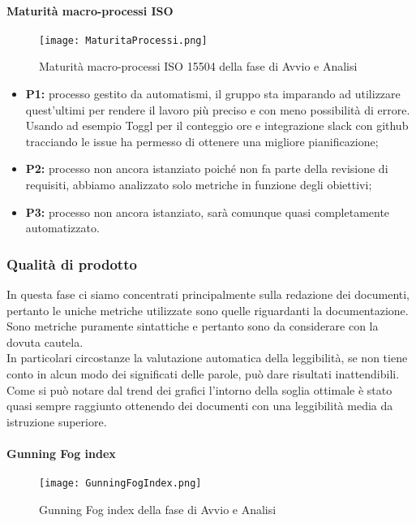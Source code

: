 \paragraph{Maturità macro-processi ISO }
\hspace{15cm}
\begin{figure}[h!]
	\centering
	\texttt{[image: MaturitaProcessi.png]}
	\caption{Maturità macro-processi ISO 15504 della fase di Avvio e Analisi}
\end{figure}
\begin{itemize}
	\item \textbf{P1:} processo gestito da automatismi, il gruppo sta imparando ad utilizzare quest'ultimi per rendere il lavoro più preciso e con meno possibilità di errore. Usando ad esempio Toggl per il conteggio ore e integrazione slack con github tracciando le issue ha
	permesso di ottenere una migliore pianificazione;
	\item \textbf{P2:} processo non ancora istanziato poiché non fa parte della revisione di requisiti, abbiamo analizzato solo metriche in funzione degli obiettivi;
	\item \textbf{P3:} processo non ancora istanziato, sarà comunque quasi completamente automatizzato.
\end{itemize}
\clearpage
\subsubsection{Qualità di prodotto}
In questa fase ci siamo concentrati principalmente sulla redazione dei documenti, pertanto le uniche metriche utilizzate sono quelle riguardanti la documentazione. \\
Sono metriche puramente sintattiche e pertanto sono da considerare con la dovuta cautela. \\
In particolari circostanze la valutazione automatica della leggibilità, se non tiene conto in alcun modo dei significati delle parole, può dare risultati inattendibili. \\
Come si può notare dal trend dei grafici l'intorno della soglia ottimale è stato quasi sempre raggiunto ottenendo dei documenti con una leggibilità media da istruzione superiore.
	\clearpage
\paragraph{Gunning Fog index}
\hspace{15cm}
\begin{figure}[!htbp]
	\centering
	\texttt{[image: GunningFogIndex.png]}
	\caption{Gunning Fog index della fase di Avvio e Analisi}

\end{figure}
